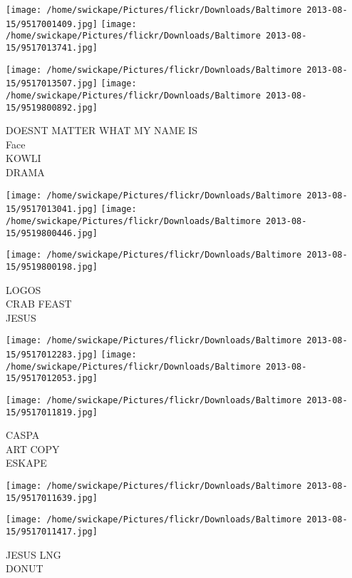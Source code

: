 \documentclass[10pt,letterpaper]{article}
\begin{document}
\texttt{[image: /home/swickape/Pictures/flickr/Downloads/Baltimore 2013-08-15/9517001409.jpg]}
\texttt{[image: /home/swickape/Pictures/flickr/Downloads/Baltimore 2013-08-15/9517013741.jpg]}

\texttt{[image: /home/swickape/Pictures/flickr/Downloads/Baltimore 2013-08-15/9517013507.jpg]}
\texttt{[image: /home/swickape/Pictures/flickr/Downloads/Baltimore 2013-08-15/9519800892.jpg]}

DOESNT MATTER WHAT MY NAME IS\\
Face\\
KOWLI\\
DRAMA\\
\pagebreak

\texttt{[image: /home/swickape/Pictures/flickr/Downloads/Baltimore 2013-08-15/9517013041.jpg]}
\texttt{[image: /home/swickape/Pictures/flickr/Downloads/Baltimore 2013-08-15/9519800446.jpg]}

\vspace{0.25in}
\texttt{[image: /home/swickape/Pictures/flickr/Downloads/Baltimore 2013-08-15/9519800198.jpg]}

LOGOS\\
CRAB FEAST\\
JESUS\\
\pagebreak

\texttt{[image: /home/swickape/Pictures/flickr/Downloads/Baltimore 2013-08-15/9517012283.jpg]}
\texttt{[image: /home/swickape/Pictures/flickr/Downloads/Baltimore 2013-08-15/9517012053.jpg]}

\texttt{[image: /home/swickape/Pictures/flickr/Downloads/Baltimore 2013-08-15/9517011819.jpg]}

CASPA\\
ART COPY\\
ESKAPE\\
\pagebreak

\texttt{[image: /home/swickape/Pictures/flickr/Downloads/Baltimore 2013-08-15/9517011639.jpg]}

\vspace{0.25in}
\texttt{[image: /home/swickape/Pictures/flickr/Downloads/Baltimore 2013-08-15/9517011417.jpg]}

JESUS LNG\\
DONUT\\
\pagebreak
\end{document}
